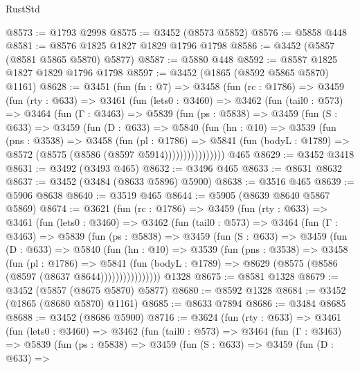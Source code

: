 \begin{lexlean}{RustStd}
\begin{coremodule}
@8573 := @1793 @2998
@8575 := @3452 (@8573 @5852)
@8576 := @5858 @448
@8581 := @8576 @1825 @1827 @1829 @1796 @1798
@8586 := @3452 (@5857 (@8581 @5865 @5870) @5877)
@8587 := @5880 @448
@8592 := @8587 @1825 @1827 @1829 @1796 @1798
@8597 := @3452 (@1865 (@8592 @5865 @5870) @1161)
@8628 := @3451
    (fun (fn : @7) =>
    @3458
      (fun (rc : @1786) =>
      @3459
        (fun (rty : @633) =>
        @3461
          (fun (lets0 : @3460) =>
          @3462
            (fun (tail0 : @573) =>
            @3464
              (fun (Γ : @3463) =>
              @5839
                (fun (ps : @5838) =>
                @3459
                  (fun (S : @633) =>
                  @3459
                    (fun (D : @633) =>
                    @5840
                      (fun (hn : @10) =>
                      @3539
                        (fun (pns : @3538) =>
                        @3458
                          (fun (pl : @1786) =>
                          @5841
                            (fun (bodyL : @1789) => @8572 (@8575 (@8586 (@8597 @5914))))))))))))))))
    @465
@8629 := @3452 @3418
@8631 := @3492 (@3493 @465)
@8632 := @3496 @465
@8633 := @8631 @8632
@8637 := @3452 (@3484 (@8633 @5896) @5900)
@8638 := @3516 @465
@8639 := @5906 @8638
@8640 := @3519 @465
@8644 := @5905 (@8639 @8640 @5867 @5869)
@8674 := @3621
    (fun (rc : @1786) =>
    @3459
      (fun (rty : @633) =>
      @3461
        (fun (lets0 : @3460) =>
        @3462
          (fun (tail0 : @573) =>
          @3464
            (fun (Γ : @3463) =>
            @5839
              (fun (ps : @5838) =>
              @3459
                (fun (S : @633) =>
                @3459
                  (fun (D : @633) =>
                  @5840
                    (fun (hn : @10) =>
                    @3539
                      (fun (pns : @3538) =>
                      @3458
                        (fun (pl : @1786) =>
                        @5841
                          (fun (bodyL : @1789) =>
                          @8629 (@8575 (@8586 (@8597 (@8637 @8644))))))))))))))))
    @1328
@8675 := @8581 @1328
@8679 := @3452 (@5857 (@8675 @5870) @5877)
@8680 := @8592 @1328
@8684 := @3452 (@1865 (@8680 @5870) @1161)
@8685 := @8633 @7894
@8686 := @3484 @8685
@8688 := @3452 (@8686 @5900)
@8716 := @3624
    (fun (rty : @633) =>
    @3461
      (fun (lets0 : @3460) =>
      @3462
        (fun (tail0 : @573) =>
        @3464
          (fun (Γ : @3463) =>
          @5839
            (fun (ps : @5838) =>
            @3459
              (fun (S : @633) =>
              @3459
                (fun (D : @633) =>

\end{coremodule}
\end{lexlean}
